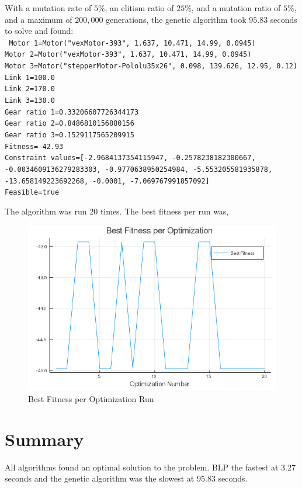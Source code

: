 \documentclass{article}
\begin{document}
With a mutation rate of $5\%$, an elitism ratio of $25\%$, and a mutation
ratio of $5\%$, and a maximum of $200,000$ generations, the genetic
algorithm took $95.83$ seconds to solve and found: \\
\texttt{
    Motor 1=Motor("vexMotor-393", 1.637, 10.471, 14.99, 0.0945) \\
    Motor 2=Motor("vexMotor-393", 1.637, 10.471, 14.99, 0.0945) \\
    Motor 3=Motor("stepperMotor-Pololu35x26", 0.098, 139.626, 12.95, 0.12) \\
    Link 1=100.0 \\
    Link 2=170.0 \\
    Link 3=130.0 \\
    Gear ratio 1=0.33206607726344173 \\
    Gear ratio 2=0.8486810156880156 \\
    Gear ratio 3=0.1529117565209915 \\
    Fitness=-42.93 \\
    Constraint values=[-2.9684137354115947, -0.2578238182300667, -0.0034609136279283303, -0.9770638950254984, -5.553205581935878, -13.658149223692268, -0.0001, -7.069767991857092] \\
    Feasible=true
}

The algorithm was run $20$ times. The best fitness per run was,
\begin{figure}[h]
    \centering
    \includegraphics[scale=0.6]{best_fitness_per_optimization.png}
    \caption{Best Fitness per Optimization Run}
    \label{fig:best_fitness_per_run}
\end{figure}

\FloatBarrier{}
\section{Summary}

All algorithms found an optimal solution to the problem. BLP the fastest at
$3.27$ seconds and the genetic algorithm was the slowest at $95.83$ seconds.

\FloatBarrier{}


\end{document}

